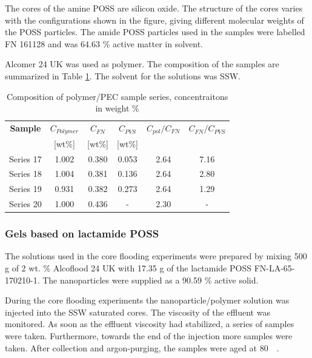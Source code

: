 The cores of the amine POSS are silicon oxide. The structure of the cores varies with the configurations shown in the figure, giving different molecular weights of the POSS particles. The amide POSS particles used in the samples were labelled FN 161128 and was 64.63 \% active matter in solvent.

Alcomer 24 UK was used as polymer. The composition of the samples are summarized in Table \ref{tab:polyPecComp}. The solvent for the solutions was SSW.

\begin{table} 

\centering
\caption{Composition of polymer/PEC sample series, concentraitons in weight \%}
\label{tab:polyPecComp}
\begin{tabular}{c c c c c c } 
\toprule
\textbf{Sample} & \textbf{$C_{Polymer}$} & \textbf{$C_{FN}$} & \textbf{$C_{PVS}$} & \textbf{$C_{pol}/C_{FN}$} & \textbf{$C_{FN}/C_{PVS}$} \\ 
&[wt\%]& [wt\%] & [wt\%] && \\
\midrule 
Series 17   & 1.002   & 0.380 & 0.053 & 2.64 & 7.16\\
Series 18   & 1.004   & 0.381 & 0.136 & 2.64 & 2.80\\ 
Series 19   & 0.931   & 0.382 & 0.273 & 2.64 & 1.29\\ 
Series 20   & 1.000   & 0.436 & - & 2.30     & - \\
\bottomrule
\end{tabular}
\end{table}

\subsubsection{Gels based on lactamide POSS}

The solutions used in the core flooding experiments were prepared by mixing 500 g of 2 wt. \% Alcoflood 24 UK with 17.35 g of the lactamide POSS FN-LA-65-170210-1. The nanoparticles were supplied as a 90.59 \% active solid.

During the core flooding experiments the nanoparticle/polymer solution was injected into the SSW saturated cores. The viscosity of the effluent was monitored. As soon as the effluent viscosity had stabilized, a series of samples were taken. Furthermore, towards the end of the injection more samples were taken. After collection and argon-purging, the samples were aged at 80~\celsius~. 


